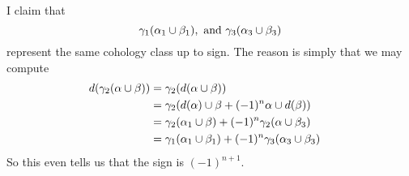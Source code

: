 \noindent
I claim that
$$
\gamma_1( \alpha_1 \cup \beta_1), \ \hbox{and}\ 
\gamma_3( \alpha_3 \cup \beta_3)
$$
represent the same cohology class up to sign.
The reason is simply that we may compute
\begin{align*}
d( \gamma_2(\alpha \cup \beta) )
& =
\gamma_2( d( \alpha \cup \beta) )
\cr
& =
\gamma_2( d(\alpha) \cup \beta + (-1)^n \alpha \cup d(\beta) )
\cr
& =
\gamma_2( \alpha_1 \cup \beta)  + (-1)^n \gamma_2( \alpha \cup \beta_3)
\cr
& =
\gamma_1( \alpha_1 \cup \beta_1) + (-1)^n \gamma_3( \alpha_3 \cup \beta_3)
\end{align*}
So this even tells us that the sign is $(-1)^{n + 1}$.












